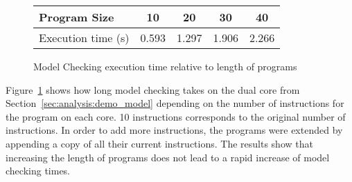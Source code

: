 \begin{figure}
\begin{center}
\begin{tabular}{|l|c|c|c|c|}
\hline
Program Size         & 10      & 20      & 30     & 40\\
\hline
Execution time (s)   & 0.593   & 1.297   & 1.906  & 2.266\\
\hline
\end{tabular}
\end{center}
\caption{Model Checking execution time relative to length of programs}
\label{fig:exec_time_program}
\end{figure}

Figure~\ref{fig:exec_time_program} shows how long model checking takes on the
dual core from Section~\ref{sec:analysis:demo_model} depending on the number of
instructions for the program on each core. 10 instructions corresponds to the
original number of instructions. In order to add more instructions, the programs
were extended by appending a copy of all their current instructions. The results
show that increasing the length of programs does not lead to a rapid increase of
model checking times.

\stopallthesefloats
